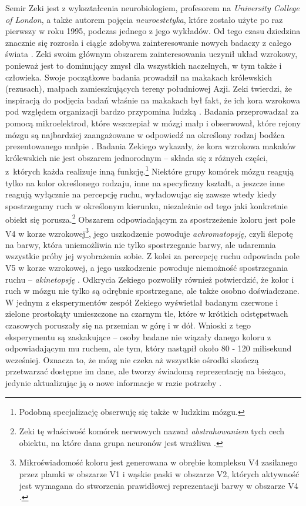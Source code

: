 \documentclass[licencjacka]{kdypl}
\begin{document}
Semir Zeki jest z wykształcenia neurobiologiem, profesorem na \textit{University College of London}, a także autorem pojęcia \textit{neuroestetyka}, które zostało użyte po raz pierwszy w roku 1995, podczas jednego z jego wykładów. Od tego czasu dziedzina znacznie się rozrosła i ciągle zdobywa zainteresowanie nowych badaczy z całego świata \citep[s. 10]{Znak}. Zeki swoim głównym obszarem zainteresowania uczynił układ wzrokowy, ponieważ jest to dominujący zmysł dla wszystkich naczelnych, w tym także i człowieka. Swoje początkowe badania prowadził na makakach królewskich (rezusach), małpach zamieszkujących tereny południowej Azji. Zeki twierdzi, że inspiracją do podjęcia badań właśnie na makakach był fakt, że ich kora wzrokowa pod względem organizacji bardzo przypomina ludzką \citep[s. 8]{Znak}. Badania przeprowadzał za pomocą mikroelektrod, które wszczepiał w mózgi małp i obserwował, które rejony mózgu są najbardziej zaangażowane w odpowiedź na określony rodzaj bodźca prezentowanego małpie \citep{Artysta}. Badania Zekiego wykazały, że kora wzrokowa makaków królewskich nie jest obszarem jednorodnym -- składa się z różnych części, z~których każda realizuje inną funkcję.\footnote{Podobną specjalizację obserwuję się także w ludzkim mózgu.} Niektóre grupy komórek mózgu reagują tylko na kolor określonego rodzaju, inne na specyficzny kształt, a jeszcze inne reagują wyłącznie na percepcję ruchu, wyładowując się zawsze wtedy kiedy spostrzegamy ruch w określonym kierunku, niezależnie od tego jaki konkretnie obiekt się porusza.\footnote{Zeki tę właściwość komórek nerwowych nazwał \textit{abstrahowaniem} tych cech obiektu, na które dana grupa neuronów jest wrażliwa \citep[s. 27]{Zeki}.} Obszarem odpowiadającym za spostrzeżenie koloru jest pole V4 w korze wzrokowej\footnote{Mikroświadomość koloru jest generowana w obrębie kompleksu V4 zasilanego przez plamki w obszarze V1 i wąskie paski w obszarze V2, których aktywność jest wymagana do stworzenia prawidłowej reprezentacji barwy w obszarze V4 \citep[s. 428]{Wieloznacznosc}.}, jego uszkodzenie powoduje \textit{achromatopsję,} czyli ślepotę na  barwy, która uniemożliwia nie tylko spostrzeganie barwy, ale udaremnia wszystkie próby jej wyobrażenia sobie. Z kolei za percepcję ruchu odpowiada pole V5 w korze wzrokowej, a jego uszkodzenie powoduje niemożność spostrzegania ruchu -- \textit{akinetopsję} \citep{Artysta}.
Odkrycia Zekiego pozwoliły również potwierdzić, że kolor i ruch w mózgu nie tylko są odrębnie spostrzegane, ale także osobno doświadczane. W jednym z eksperymentów zespół Zekiego wyświetlał badanym czerwone i zielone prostokąty umieszczone na czarnym tle, które w krótkich odstępstwach czasowych poruszały się na przemian w górę i w dół. Wnioski z tego eksperymentu są zaskakujące -- osoby badane nie wiązały danego koloru z odpowiadającym mu ruchem, ale tym, który nastąpił około 80 - 120 milisekund wcześniej. Oznacza to, że mózg nie czeka aż wszystkie ośrodki skończą przetwarzać dostępne im dane, ale tworzy świadomą reprezentację na bieżąco, jedynie aktualizując ją o nowe informacje w razie potrzeby \citep{Artysta}. 
\end{document}
